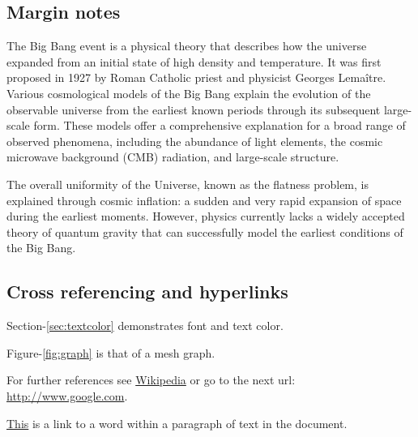 \subsection{Margin notes}

The Big Bang event is a physical theory that describes how the universe 
expanded from an initial state of high density and temperature. It was 
first proposed in 1927 by Roman Catholic priest and physicist Georges Lemaître. 
Various  cosmological models of the Big Bang 
explain the evolution of the observable universe from the earliest known 
periods through its subsequent large-scale form. These models offer a 
comprehensive explanation for a broad range of observed phenomena, including 
the abundance of light elements, the cosmic microwave background (CMB) 
radiation, and large-scale structure. 

\par

The overall uniformity of the Universe, known as the flatness problem, is 
explained through cosmic inflation: a sudden and very rapid expansion of space 
during the earliest moments. However, physics currently lacks a widely accepted 
theory of quantum gravity that can successfully model the earliest conditions 
of the Big Bang.

\subsection{Cross referencing and hyperlinks}

Section-\ref{sec:textcolor} demonstrates font and text color.
\par
Figure-\ref{fig:graph} is that of a mesh graph.
\par
For further references see \href{http://www.wikipedia.com}{Wikipedia} 
or go to the next url: \url{http://www.google.com}.
\par
\hyperlink{word:w1}{This} is a link to a word within a paragraph of text in the document.
